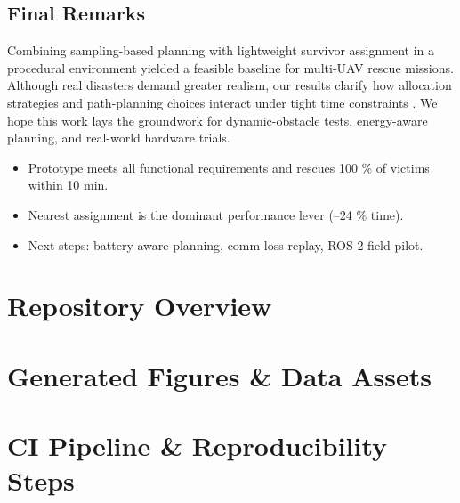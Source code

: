 \documentclass[12pt,a4paper]{report}
\begin{document}
\section{Final Remarks}
Combining sampling-based planning with lightweight survivor assignment in a
procedural environment yielded a feasible baseline for multi-UAV rescue
missions. Although real disasters demand greater realism, our results clarify
how allocation strategies and path-planning choices interact under tight time
constraints
\cite{Erdelj2017MultiUAV,Daud2022DroneDisaster,Murphy2016DisasterRoboticsNepal}.
We hope this work lays the groundwork for dynamic-obstacle tests, energy-aware
planning, and real-world hardware trials.

\begin{tcolorbox}[colback=gray!10,title=\textbf{Take-away 7.1}]
\begin{itemize}[leftmargin=1.2em]
  \item Prototype meets all functional requirements and rescues 100 \% of
        victims within 10 min.
  \item Nearest assignment is the dominant performance lever (–24 \% time).
  \item Next steps: battery-aware planning, comm-loss replay, ROS 2 field pilot.
\end{itemize}
\end{tcolorbox}


\clearpage
\appendix
{}

\chapter{Repository Overview}


\chapter{Generated Figures \& Data Assets}


\chapter{CI Pipeline \& Reproducibility Steps}



\end{document}
